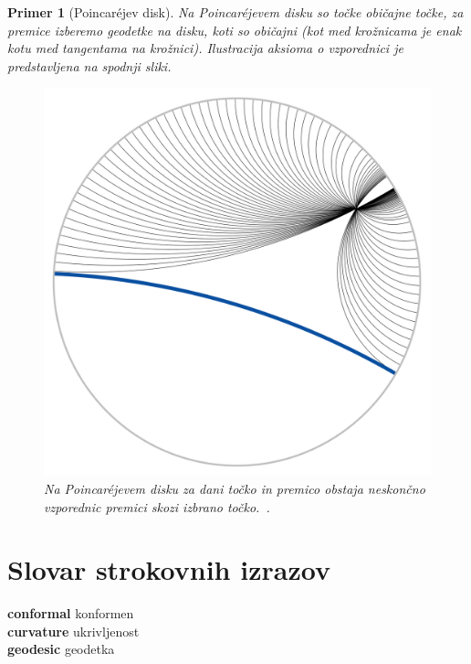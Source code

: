 \documentclass[a4paper]{article}
\newtheorem{primer}{Primer}
\newcommand{\geslo}[2]{\noindent\textbf{#1} \quad \hangindent=1cm #2\\[-1pc]}
\begin{document}
\begin{primer}[Poincar\'ejev disk]
Na Poincar\'ejevem disku so točke običajne točke, za premice izberemo geodetke na disku, koti so običajni (kot med krožnicama je enak kotu med tangentama na krožnici). Ilustracija aksioma o vzporednici je predstavljena na spodnji sliki.
%
\begin{figure}[h!]
\begin{center}
\includegraphics[scale=0.15]{poincare-disk-5aksiom.png}
\caption{Na Poincar\'ejevem disku za dani točko in premico obstaja neskončno vzporednic premici skozi izbrano točko.~\cite[vir slike]{hypGeom-wiki}.}
\end{center}
\end{figure}
%
\end{primer}


\section*{Slovar strokovnih izrazov}

\geslo{conformal}{konformen}

\geslo{curvature}{ukrivljenost}

\geslo{geodesic}{geodetka}
\end{document}
